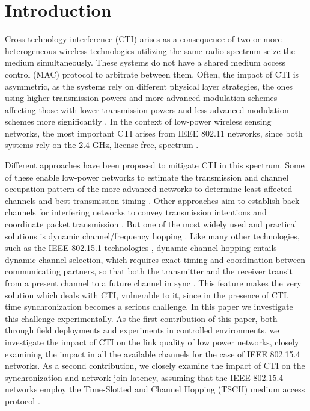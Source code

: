 \section{Introduction}
\label{sec:intro}

Cross technology interference (CTI) arises as a consequence of two or more heterogeneous wireless technologies utilizing the same radio spectrum seize the medium simultaneously. These systems do not have a shared medium access control (MAC) protocol to arbitrate between them. Often, the impact of CTI is asymmetric, as the systems rely on different physical layer strategies, the ones using higher transmission powers and more advanced modulation schemes affecting those with lower transmission powers and less advanced modulation schemes more significantly \cite{dargie2024mitigating}. In the context of low-power wireless sensing networks, the most important CTI arises from IEEE 802.11 networks, since both systems rely on the 2.4 GHz, license-free, spectrum \cite{shi2017signal}. 

Different approaches have been proposed to mitigate CTI in this spectrum. Some of these enable low-power networks to estimate the transmission and channel occupation pattern of the more advanced networks to determine least affected channels and best transmission timing \cite{hithnawi2016crosszig}. Other approaches aim to establish back-channels for interfering networks to  convey transmission intentions and coordinate packet transmission \cite{yin2018explicit, guo2020zigfi}. But one of the most widely used and practical solutions is dynamic channel/frequency hopping \cite{hermeto2017scheduling}. Like many other technologies, such as the IEEE 802.15.1 technologies  \cite{golmie2003bluetooth}, dynamic channel hopping entails dynamic channel selection, which requires exact timing and coordination between communicating partners, so that both the  transmitter and the receiver transit from a present channel to a future channel in sync \cite{chang2015adaptive, duquennoy2017tsch}. This feature makes the very solution which deals with CTI, vulnerable to it, since in the presence of CTI, time synchronization becomes a serious challenge. In this paper we investigate this challenge experimentally. As the first contribution of this paper, both through field deployments and experiments in controlled environments, we investigate the impact of CTI on the link quality of low power networks, closely examining the impact in all the available channels for the case of IEEE 802.15.4 networks. As a second contribution, we closely examine the  impact of CTI on the synchronization and network join latency, assuming that the IEEE 802.15.4 networks employ the Time-Slotted and Channel Hopping (TSCH) medium access protocol \cite{tinka2010decentralized}. 

